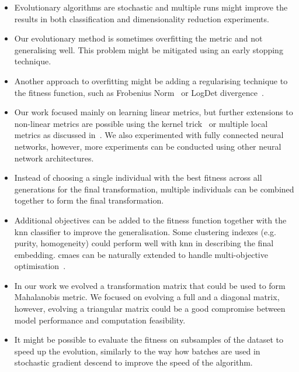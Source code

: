 \documentclass[12pt,a4paper]{report}
\begin{document}
\begin{itemize}
\item Evolutionary algorithms are stochastic and multiple runs might improve the results in both classification and dimensionality reduction experiments.

\item Our evolutionary method is sometimes overfitting the metric and not generalising well. This problem might be mitigated using an early stopping technique.

\item Another approach to overfitting might be adding a regularising technique to the fitness function, such as Frobenius Norm~\citep{schultz2003learning} or LogDet divergence~\citep{davis2007information}.

\item Our work focused mainly on learning linear metrics, but further extensions to non-linear metrics are possible using the kernel trick~\citep{chatpatanasiri2010new} or multiple local metrics as discussed in~\citep{bellet2013survey}. We also experimented with fully connected neural networks, however, more experiments can be conducted using other neural network architectures.

\item Instead of choosing a single individual with the best fitness across all generations for the final transformation, multiple individuals can be combined together to form the final transformation.

\item Additional objectives can be added to the fitness function together with the \ac{knn} classifier to improve the generalisation. Some clustering indexes (e.g. purity, homogeneity) could perform well with \ac{knn} in describing the final embedding. \ac{cmaes} can be naturally extended to handle multi-objective optimisation~\citep{igel2007covariance}.

\item In our work we evolved a transformation matrix that could be used to form Mahalanobis metric. We focused on evolving a full and a diagonal matrix, however, evolving a triangular matrix could be a good compromise between model performance and computation feasibility.

\item It might be possible to evaluate the fitness on subsamples of the dataset to speed up the evolution, similarly to the way how batches are used in stochastic gradient descend to improve the speed of the algorithm.
\end{itemize}
\end{document}
